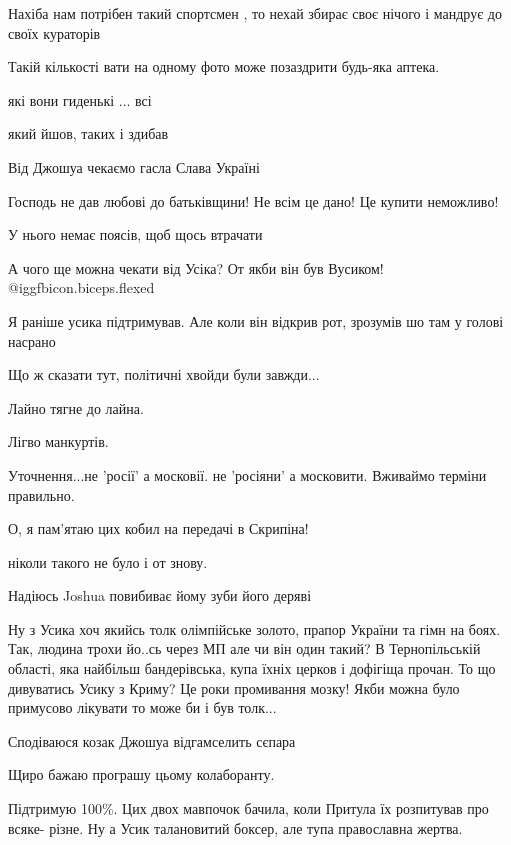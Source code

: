 \begin{itemize}
Нахіба нам потрібен такий спортсмен , то нехай збирає своє нічого і мандрує до своїх кураторів

Такій кількості вати на одному фото може позаздрити будь-яка аптека.

які вони гиденькі ... всі

який йшов, таких і здибав


Від Джошуа чекаємо гасла Слава Україні

Господь не дав любові до батьківщини! Не всім це дано! Це купити неможливо!

У нього немає поясів, щоб щось втрачати

А чого ще можна чекати від Усіка? От якби він був Вусиком! @igg{fbicon.biceps.flexed} 

Я раніше усика підтримував. Але коли він відкрив рот, зрозумів шо там у голові насрано

Що ж сказати тут, політичні хвойди були завжди...

Лайно тягне до лайна.

Лігво манкуртів.

Уточнення...не 'росії' а московії. не 'росіяни' а московити. Вживаймо терміни правильно.

О, я пам'ятаю цих кобил на передачі в Скрипіна!

ніколи такого не було і от знову.

Надіюсь Joshua повибиває йому зуби його деряві

Ну з Усика хоч якийсь толк олімпійське золото, прапор України та гімн на боях. Так, людина трохи йо..сь через МП але чи він один такий? В Тернопільській області, яка найбільш бандерівська, купа їхніх церков і дофігіща прочан. То що дивуватись Усику з Криму? Це роки промивання мозку! Якби можна було примусово лікувати то може би і був толк...

Сподіваюся козак Джошуа відгамселить сєпара

Щиро бажаю програшу цьому колаборанту.

Підтримую 100\%. Цих двох мавпочок бачила, коли Притула їх розпитував про всяке- різне. Ну а Усик талановитий боксер, але тупа православна жертва.


\end{itemize}

